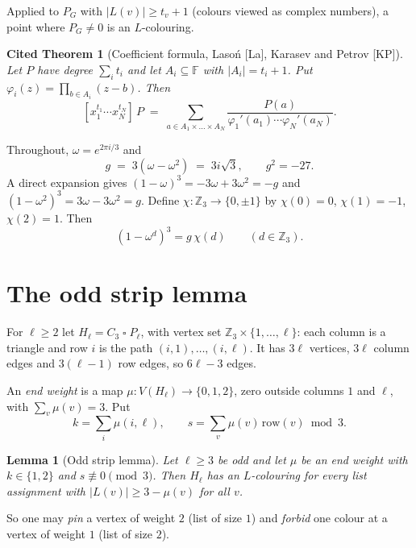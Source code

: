 \documentclass[11pt]{article}
\theoremstyle{plain}
\newtheorem{lemma}[theorem]{Lemma}
\newtheorem{citedtheorem}[theorem]{Cited Theorem}
\theoremstyle{definition}
\theoremstyle{remark}
\newcommand{\T}{\mathbin{\square}}
\newcommand{\Z}{\mathbb{Z}}
\begin{document}
Applied to $P_G$ with $|L(v)| \ge t_v + 1$ (colours viewed as complex numbers), a point where
$P_G \ne 0$ is an $L$-colouring.

\begin{citedtheorem}[Coefficient formula, Lasoń {[La]}, Karasev and Petrov {[KP]}]\label{thm:coef}
Let $P$ have degree $\sum_i t_i$ and let $A_i \subseteq \mathbb{F}$ with $|A_i| = t_i + 1$. Put
$\varphi_i(z) = \prod_{b \in A_i} (z - b)$. Then
\[
[x_1^{t_1} \cdots x_N^{t_N}]\, P \;=\; \sum_{a \in A_1 \times \dots \times A_N}
\frac{P(a)}{\varphi_1'(a_1) \cdots \varphi_N'(a_N)} .
\]
\end{citedtheorem}

Throughout, $\omega = e^{2\pi i/3}$ and
\[
g \;=\; 3(\omega - \omega^2) \;=\; 3 i \sqrt3, \qquad g^2 = -27 .
\]
A direct expansion gives $(1-\omega)^3 = -3\omega + 3\omega^2 = -g$ and
$(1-\omega^2)^3 = 3\omega - 3\omega^2 = g$. Define $\chi : \Z_3 \to \{0, \pm 1\}$ by
$\chi(0) = 0$, $\chi(1) = -1$, $\chi(2) = 1$. Then
\begin{equation}\label{eq:chi}
(1 - \omega^d)^3 = g\,\chi(d) \qquad (d \in \Z_3).
\end{equation}

\section{The odd strip lemma}\label{sec:strip}

For $\ell \ge 2$ let $H_\ell = C_3 \T P_\ell$, with vertex set $\Z_3 \times \{1, \dots, \ell\}$:
each column is a triangle and row $i$ is the path $(i,1), \dots, (i,\ell)$. It has $3\ell$
vertices, $3\ell$ column edges and $3(\ell - 1)$ row edges, so $6\ell - 3$ edges.

An \emph{end weight} is a map $\mu : V(H_\ell) \to \{0, 1, 2\}$, zero outside columns $1$ and
$\ell$, with $\sum_v \mu(v) = 3$. Put
\[
k = \sum_{i} \mu(i, \ell), \qquad s = \sum_{v} \mu(v)\, \mathrm{row}(v) \bmod 3 .
\]

\begin{lemma}[Odd strip lemma]\label{lem:strip}
Let $\ell \ge 3$ be odd and let $\mu$ be an end weight with $k \in \{1, 2\}$ and $s \not\equiv 0
\pmod 3$. Then $H_\ell$ has an $L$-colouring for every list assignment with
$|L(v)| \ge 3 - \mu(v)$ for all $v$.
\end{lemma}

So one may \emph{pin} a vertex of weight $2$ (list of size $1$) and \emph{forbid} one colour at a
vertex of weight $1$ (list of size $2$).
\end{document}
